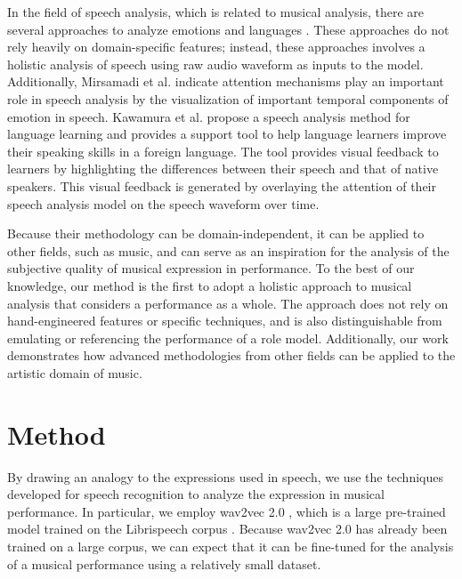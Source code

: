 \documentclass[manuscript,review,anonymous]{acmart}
\begin{document}
In the field of speech analysis, which is related to musical analysis, there are several approaches to analyze emotions and languages \cite{EmotionRNN, conneau-etal-2020-unsupervised}. 
These approaches do not rely heavily on domain-specific features; instead, these approaches involves a holistic analysis of speech using raw audio waveform as inputs to the model. 
Additionally, Mirsamadi et al. \cite{EmotionRNN} indicate attention mechanisms play an important role in speech analysis by the visualization of important temporal components of emotion in speech. Kawamura et al. \cite{KawamuraUist21, ddsupport} propose a speech analysis method for language learning and provides a support tool to help language learners improve their speaking skills in a foreign language. 
The tool provides visual feedback to learners by highlighting the differences between their speech and that of native speakers. 
This visual feedback is generated by overlaying the attention of their speech analysis model on the speech waveform over time. 

Because their methodology can be domain-independent, it can be applied to other fields, such as music, and can serve as an inspiration for the analysis of the subjective quality of musical expression in performance. 
To the best of our knowledge, our method is the first to adopt a holistic approach to musical analysis that considers a performance as a whole.
The approach does not rely on hand-engineered features or specific techniques, and is also distinguishable from emulating or referencing the performance of a role model. 
Additionally, our work demonstrates how advanced methodologies from other fields can be applied to the artistic domain of music.


\section{Method}
By drawing an analogy to the expressions used in speech, we use the techniques developed for speech recognition to analyze the expression in musical performance.
In particular, we employ wav2vec 2.0 \cite{wav2vec2}, which is a large pre-trained model trained on the Librispeech corpus \cite{Librispeech}. 
Because wav2vec 2.0 has already been trained on a large corpus, we can expect that it can be fine-tuned for the analysis of a musical performance using a relatively small dataset. 
\end{document}

